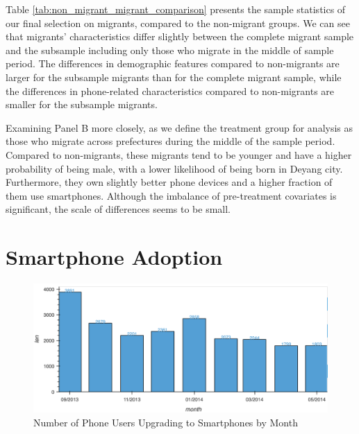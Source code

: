 
Table \ref{tab:non_migrant_migrant_comparison} presents the sample statistics of our final selection on migrants, compared to the non-migrant groups.
We can see that migrants' characteristics differ slightly between the complete migrant sample and the subsample including only those who migrate in the middle of sample period.
The differences in demographic features compared to non-migrants are larger for the subsample migrants than for the complete migrant sample, while the differences in phone-related characteristics compared to non-migrants are smaller for the subsample migrants.


Examining Panel B more closely, as we define the treatment group for analysis as those who migrate across prefectures during the middle of the sample period.
Compared to non-migrants, these migrants tend to be younger and have a higher probability of being male, with a lower likelihood of being born in Deyang city.
Furthermore, they own slightly better phone devices and a higher fraction of them use smartphones.
Although the imbalance of pre-treatment covariates is significant, the scale of differences seems to be small.


\section{Smartphone Adoption}
\begin{figure}[h!]
\centering
\caption{Number of Phone Users Upgrading to Smartphones by Month}
\vspace{0.1cm}

\includegraphics[scale=0.51]{figures/number_of_smartphone_adopters.png}


\label{fig:number_of_smartphone_changers}
\end{figure}

